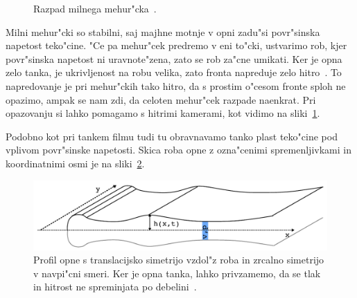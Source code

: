 \documentclass[a4paper,10pt]{article}
\begin{document}
\begin{figure}[h]
 \centering
{}
\caption{Razpad milnega mehur"cka~\cite{slike-mehurcek}. }
\label{fig:mehurcek-3}
\end{figure}

Milni mehur"cki so stabilni, saj majhne motnje v opni zadu"si povr"sinska napetost teko"cine. "Ce pa mehur"cek predremo v eni to"cki, ustvarimo rob, kjer povr"sinska napetost ni uravnote"zena, zato se rob za"cne umikati. Ker je opna zelo tanka, je ukrivljenost na robu velika, zato fronta napreduje zelo hitro~\cite{diploma}. To napredovanje je pri mehur"ckih tako hitro, da s prostim o"cesom fronte sploh ne opazimo, ampak se nam zdi, da celoten mehur"cek razpade naenkrat. Pri opazovanju si lahko pomagamo s hitrimi kamerami, kot vidimo na sliki~\ref{fig:mehurcek-3}. 

Podobno kot pri tankem filmu tudi tu obravnavamo tanko plast teko"cine pod vplivom povr"sinske napetosti. Skica roba opne z ozna"cenimi spremenljivkami in koordinatnimi osmi je na sliki~\ref{fig:mehurcek-skica}. 
\begin{figure}[h]
 \centering
\includegraphics[width=.8\textwidth]{./Slike/mehurcek-skica}
\caption{Profil opne s translacijsko simetrijo vzdol"z roba in zrcalno simetrijo v navpi"cni smeri. Ker je opna tanka, lahko privzamemo, da se tlak in hitrost ne spreminjata po debelini~\cite{diploma}. }
\label{fig:mehurcek-skica}
\end{figure}
\end{document}
